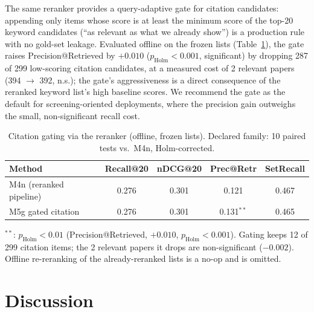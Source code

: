 \documentclass[nonacm,sigconf]{acmart}
\begin{document}
The same reranker provides a query-adaptive gate for citation candidates:
appending only items whose score is at least the minimum score of the
top-20 keyword candidates (``as relevant as what we already show'') is a
production rule with no gold-set leakage. Evaluated offline on the frozen
lists (Table~\ref{tab:rerank}), the gate raises Precision@Retrieved by
$+0.010$ ($p_{\text{Holm}}{<}0.001$, significant) by dropping 287 of 299
low-scoring citation candidates, at a measured cost of 2 relevant papers
(394 $\rightarrow$ 392, n.s.); the gate's aggressiveness is a direct
consequence of the reranked keyword list's high baseline scores. We
recommend the gate as the default for screening-oriented deployments,
where the precision gain outweighs the small, non-significant recall
cost.

\begin{table}[t]
\centering
\small
\setlength{\tabcolsep}{4pt}
\begin{threeparttable}
\caption{Citation gating via the reranker (offline, frozen lists).
Declared family: 10 paired tests vs.\ M4n, Holm-corrected.}
\label{tab:rerank}
\begin{tabular}{@{}lcccc@{}}
\toprule
Method & Recall@20 & nDCG@20 & Prec@Retr & SetRecall \\
\midrule
M4n (reranked pipeline) & 0.276 & 0.301 & 0.121 & 0.467 \\
M5g gated citation & 0.276 & 0.301 & 0.131$^{**}$ & 0.465 \\
\bottomrule
\end{tabular}
\begin{tablenotes}
\item $^{**}$: $p_{\text{Holm}}<0.01$ (Precision@Retrieved, $+0.010$,
$p_{\text{Holm}}{<}0.001$). Gating keeps 12 of 299 citation items; the
2 relevant papers it drops are non-significant ($-0.002$). Offline
re-reranking of the already-reranked lists is a no-op and is omitted.
\end{tablenotes}
\end{threeparttable}
\end{table}

\section{Discussion}
\label{sec:discussion}
\end{document}
